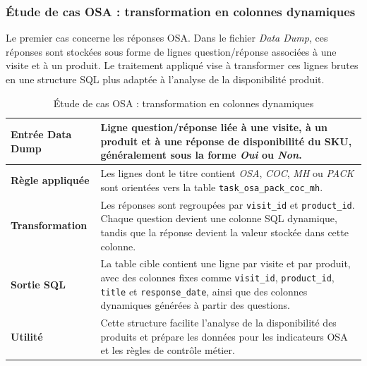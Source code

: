 \subsubsection{Étude de cas OSA : transformation en colonnes dynamiques}

Le premier cas concerne les réponses OSA. Dans le fichier \textit{Data Dump}, ces réponses sont stockées sous forme de lignes question/réponse associées à une visite et à un produit. Le traitement appliqué vise à transformer ces lignes brutes en une structure SQL plus adaptée à l’analyse de la disponibilité produit.

\begin{table}[H]
\centering

\begin{tcolorbox}[technicalbox,breakable=false,title={Étude de cas OSA --- Pivot dynamique},halign title=center]
\small
\renewcommand{\arraystretch}{1.35}
\begin{tabular}{p{}|p{}}

\textbf{Entrée Data Dump} &
Ligne question/réponse liée à une visite, à un produit et à une réponse de disponibilité du SKU, généralement sous la forme \textit{Oui} ou \textit{Non}. \\
\hline

\textbf{Règle appliquée} &
Les lignes dont le titre contient \textit{OSA}, \textit{COC}, \textit{MH} ou \textit{PACK} sont orientées vers la table \texttt{task\_osa\_pack\_coc\_mh}. \\
\hline

\textbf{Transformation} &
Les réponses sont regroupées par \texttt{visit\_id} et \texttt{product\_id}. Chaque question devient une colonne SQL dynamique, tandis que la réponse devient la valeur stockée dans cette colonne. \\
\hline

\textbf{Sortie SQL} &
La table cible contient une ligne par visite et par produit, avec des colonnes fixes comme \texttt{visit\_id}, \texttt{product\_id}, \texttt{title} et \texttt{response\_date}, ainsi que des colonnes dynamiques générées à partir des questions. \\
\hline

\textbf{Utilité} &
Cette structure facilite l’analyse de la disponibilité des produits et prépare les données pour les indicateurs OSA et les règles de contrôle métier.

\end{tabular}
\end{tcolorbox}

\caption{Étude de cas OSA : transformation en colonnes dynamiques}
\label{tab:osa_transformation}
\end{table}


